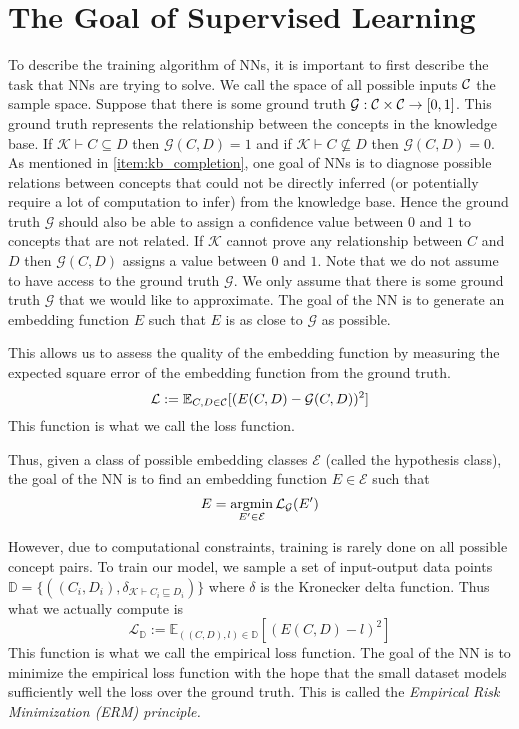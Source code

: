 \section{The Goal of Supervised Learning}
To describe the training algorithm of NNs, it is important to first describe the task 
that NNs are trying to solve.
We call the space of all possible inputs $\mathcal{C}$ the sample space.
Suppose that there is some ground truth $\mathcal{G}:\mathcal{C}\times\mathcal{C}\to[0,1]$.
This ground truth represents the relationship between the concepts in the knowledge base.
If $\mathcal{K}\vdash C\subseteq D$ then $\mathcal{G}(C,D)=1$ and if $\mathcal{K}\vdash C\not\subseteq D$ then $\mathcal{G}(C,D)=0$.
As mentioned in \ref{item:kb_completion}, one goal of NNs is
to diagnose possible relations between concepts that could not be directly inferred (or potentially require a lot of computation to infer) from the knowledge base.
Hence the ground truth $\mathcal{G}$ should also be able to assign a confidence value between $0$ and $1$ to concepts that are not related.
If $\mathcal{K}$ cannot prove any relationship between $C$ and $D$ then $\mathcal{G}(C,D)$ assigns a value between $0$ and $1$.
Note that we do not assume to have access to the ground truth $\mathcal{G}$.
We only assume that there is some ground truth $\mathcal{G}$ that we would like to approximate.
The goal of the NN is to generate an embedding function $E$ such that $E$ is as close to $\mathcal{G}$ as possible.

This allows us to assess the quality of the embedding function by measuring the expected square error of the embedding function from the ground truth.
\[
    \mathcal{L}:=\mathbb{E}_{C,D\in\mathcal{C}}[(E(C,D)-\mathcal{G}(C,D))^2]
\]
This function is what we call the loss function.

Thus, given a class of possible embedding classes $\mathcal{E}$ (called the hypothesis class), the goal of the NN is to find an embedding function $E\in\mathcal{E}$
such that
\[
    E=\mathop{\mathrm{argmin}}\limits_{E'\in\mathcal{E}}\mathcal{L}_{\mathcal{G}}(E')    
\]


However, due to computational constraints, 
training is rarely done on all possible concept pairs. To train our model, we sample a set of input-output
data points $\mathbb{D}=\{((C_i,D_i),\delta_{\mathcal{K}\vdash C_i\sqsubseteq D_i})\}$
where $\delta$ is the Kronecker delta function.
Thus what we actually compute is
\[
    \mathcal{L}_{\mathbb{D}}:=\mathbb{E}_{((C,D),l)\in\mathbb{D}}[(E(C,D)-l)^2]
\]
This function is what we call the empirical loss function. The goal of the NN is to minimize the empirical loss function
with the hope that the small dataset models sufficiently well the loss over the ground truth.
This is called the \it{Empirical Risk Minimization} (ERM) principle.


